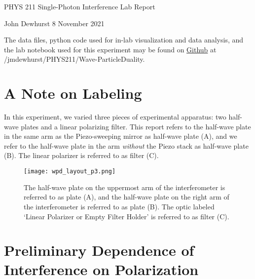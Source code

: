 \documentclass[letter]{article}
\begin{document}

\begin{center}
	{\large PHYS 211 Single-Photon Interference Lab Report}
	
	John Dewhurst \hspace{1cm}
	8 November 2021
	
	\vspace{1em}
	
	The data files, python code used for in-lab visualization and data analysis, and the lab notebook used for this experiment may be found on \href{https://github.com/jmdewhurst/PHYS211.git}{Github} at /jmdewhurst/PHYS211/Wave-ParticleDuality.
	
	\vspace{1em}
\end{center}
	

\setcounter{section}{-1}
\section{A Note on Labeling}
In this experiment, we varied three pieces of experimental apparatus: two half-wave plates and a linear polarizing filter. This report refers to the half-wave plate in the same arm as the Piezo-sweeping mirror as half-wave plate (A), and we refer to the half-wave plate in the arm \textit{without} the Piezo stack as half-wave plate (B). The linear polarizer is referred to as filter (C).

\begin{figure}[h] \centering
    \texttt{[image: wpd\_layout\_p3.png]}
    \caption{The half-wave plate on the uppermost arm of the interferometer is referred to as plate (A), and the half-wave plate on the right arm of the interferometer is referred to as plate (B). The optic labeled `Linear Polarizer or Empty Filter Holder' is referred to as filter (C).}
    \label{fig:layout}
\end{figure}

\section{Preliminary Dependence of Interference on Polarization}
\end{document}
